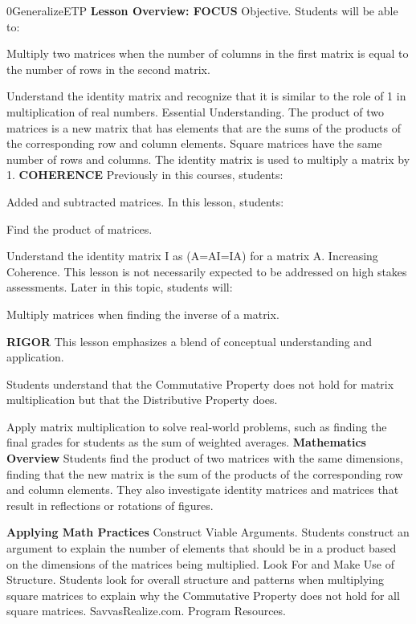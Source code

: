 \documentclass{article}
\newenvironment{te-addendum}[2]{}{}     %
\newcommand{\te}[1]{}                   %
\begin{document}
\begin{te-addendum}{0}{GeneralizeETP}
\textbf{Lesson Overview: FOCUS}
Objective. Students will be able to:
\item Multiply two matrices when the number of columns in the first matrix is equal to the number of rows in the second matrix.
\item Understand the identity matrix and recognize that it is similar to the role of 1 in multiplication of real numbers.
Essential Understanding. The product of two matrices is a new matrix that has elements that are the sums of the products of the corresponding row and column elements. Square matrices have the same number of rows and columns. The identity matrix is used to multiply a matrix by 1.
\textbf{COHERENCE}
Previously in this courses, students:
\item Added and subtracted matrices.
In this lesson, students:
\item Find the product of matrices.
\item Understand the identity matrix I as (A=AI=IA) for a matrix A.
Increasing Coherence. This lesson is not necessarily expected to be addressed on high stakes assessments.
Later in this topic, students will:
\item Multiply matrices when finding the inverse of a matrix.
\te{Printed "in this courses"; likely "in this course".}
\textbf{RIGOR}
This lesson emphasizes a blend of conceptual understanding and application.
\item Students understand that the Commutative Property does not hold for matrix multiplication but that the Distributive Property does.
\item Apply matrix multiplication to solve real-world problems, such as finding the final grades for students as the sum of weighted averages.
\textbf{Mathematics Overview}
Students find the product of two matrices with the same dimensions, finding that the new matrix is the sum of the products of the corresponding row and column elements. They also investigate identity matrices and matrices that result in reflections or rotations of figures.
\te{Printed overview restricts the matrices to "the same dimensions"; the lesson also multiplies rectangular matrices with different dimensions.}
\textbf{Applying Math Practices}
Construct Viable Arguments. Students construct an argument to explain the number of elements that should be in a product based on the dimensions of the matrices being multiplied.
Look For and Make Use of Structure. Students look for overall structure and patterns when multiplying square matrices to explain why the Commutative Property does not hold for all square matrices.
SavvasRealize.com. Program Resources.
\end{te-addendum}
\end{document}
